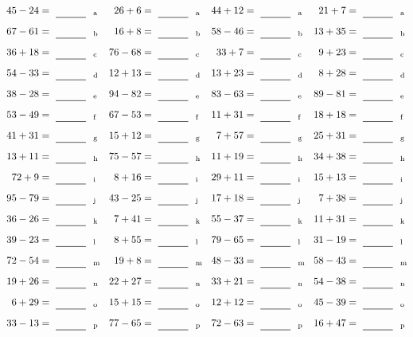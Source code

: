\documentclass
[
  draft    = true,
  fontsize = 11pt,
  parskip  = half-
]
{scrartcl}
\begin{document}
\clearpage
\begin{align*}
    \pline{45-24}&=\rline{a}
  & \pline{26+6}&=\rline{a}
  & \pline{44+12}&=\rline{a}
  & \pline{21+7}&=\rline{a} \\[1ex]
    \pline{67-61}&=\rline{b}
  & \pline{16+8}&=\rline{b}
  & \pline{58-46}&=\rline{b}
  & \pline{13+35}&=\rline{b} \\[1ex]
    \pline{36+18}&=\rline{c}
  & \pline{76-68}&=\rline{c}
  & \pline{33+7}&=\rline{c}
  & \pline{9+23}&=\rline{c} \\[1ex]
    \pline{54-33}&=\rline{d}
  & \pline{12+13}&=\rline{d}
  & \pline{13+23}&=\rline{d}
  & \pline{8+28}&=\rline{d} \\[1ex]
    \pline{38-28}&=\rline{e}
  & \pline{94-82}&=\rline{e}
  & \pline{83-63}&=\rline{e}
  & \pline{89-81}&=\rline{e} \\[1ex]
    \pline{53-49}&=\rline{f}
  & \pline{67-53}&=\rline{f}
  & \pline{11+31}&=\rline{f}
  & \pline{18+18}&=\rline{f} \\[1ex]
    \pline{41+31}&=\rline{g}
  & \pline{15+12}&=\rline{g}
  & \pline{7+57}&=\rline{g}
  & \pline{25+31}&=\rline{g} \\[1ex]
    \pline{13+11}&=\rline{h}
  & \pline{75-57}&=\rline{h}
  & \pline{11+19}&=\rline{h}
  & \pline{34+38}&=\rline{h} \\[1ex]
    \pline{72+9}&=\rline{i}
  & \pline{8+16}&=\rline{i}
  & \pline{29+11}&=\rline{i}
  & \pline{15+13}&=\rline{i} \\[1ex]
    \pline{95-79}&=\rline{j}
  & \pline{43-25}&=\rline{j}
  & \pline{17+18}&=\rline{j}
  & \pline{7+38}&=\rline{j} \\[1ex]
    \pline{36-26}&=\rline{k}
  & \pline{7+41}&=\rline{k}
  & \pline{55-37}&=\rline{k}
  & \pline{11+31}&=\rline{k} \\[1ex]
    \pline{39-23}&=\rline{l}
  & \pline{8+55}&=\rline{l}
  & \pline{79-65}&=\rline{l}
  & \pline{31-19}&=\rline{l} \\[1ex]
    \pline{72-54}&=\rline{m}
  & \pline{19+8}&=\rline{m}
  & \pline{48-33}&=\rline{m}
  & \pline{58-43}&=\rline{m} \\[1ex]
    \pline{19+26}&=\rline{n}
  & \pline{22+27}&=\rline{n}
  & \pline{33+21}&=\rline{n}
  & \pline{54-38}&=\rline{n} \\[1ex]
    \pline{6+29}&=\rline{o}
  & \pline{15+15}&=\rline{o}
  & \pline{12+12}&=\rline{o}
  & \pline{45-39}&=\rline{o} \\[1ex]
    \pline{33-13}&=\rline{p}
  & \pline{77-65}&=\rline{p}
  & \pline{72-63}&=\rline{p}
  & \pline{16+47}&=\rline{p}
\end{align*}
\end{document}

